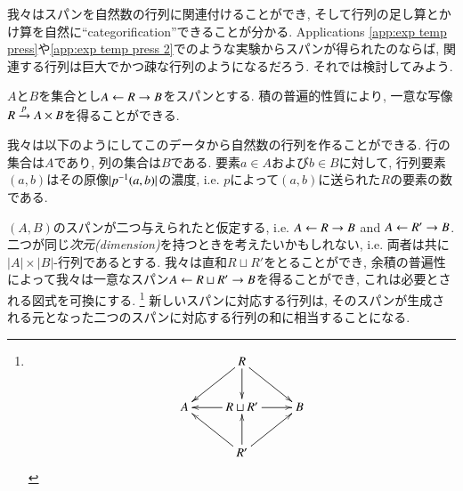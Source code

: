 
我々はスパンを自然数の行列に関連付けることができ, そして行列の足し算とかけ算を自然に``categorification''できることが分かる. Applications \ref{app:exp temp press}や\ref{app:exp temp press 2}でのような実験からスパンが得られたのならば, 関連する行列は巨大でかつ疎な行列のようになるだろう. それでは検討してみよう.


$A$と$B$を集合とし$A\leftarrow R\rightarrow B$をスパンとする. 積の普遍的性質により, 一意な写像$R\xrightarrow{p}A\times B$を得ることができる.


我々は以下のようにしてこのデータから自然数の行列を作ることができる. 行の集合は$A$であり, 列の集合は$B$である. 要素$a\in A$および$b\in B$に対して, 行列要素$(a,b)$はその原像$|p^\m1(a,b)|$の濃度, i.e. $p$によって$(a,b)$に送られた$R$の要素の数である.


$(A,B)$のスパンが二つ与えられたと仮定する, i.e. $A\leftarrow R\rightarrow B$ and $A\leftarrow R'\rightarrow B$. 二つが同じ\emph{次元(dimension)}を持つときを考えたいかもしれない, i.e. 両者は共に$|A|\times|B|$-行列であるとする. 我々は直和$R\sqcup R'$をとることができ, 余積の普遍性によって我々は一意なスパン$A\leftarrow R\sqcup R'\rightarrow B$を得ることができ, これは必要とされる図式を可換にする.
\footnote{
$$\xymatrix{
&R\ar[dl]\ar[dr]\ar[d]\\
A&R\sqcup R'\ar[l]\ar[r]&B\\
&R'\ar[ur]\ar[ul]\ar[u]}
$$
}
新しいスパンに対応する行列は, そのスパンが生成される元となった二つのスパンに対応する行列の和に相当することになる.

